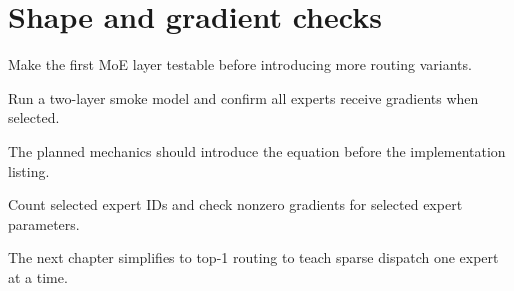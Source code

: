 \section{Shape and gradient checks}
\label{sec:ch03-shape-and-gradient-checks}

Make the first MoE layer testable before introducing more routing variants.



Run a two-layer smoke model and confirm all experts receive gradients when selected.



The planned mechanics should introduce the equation before the implementation listing.





\begin{checkpointbox}
Count selected expert IDs and check nonzero gradients for selected expert parameters.
\end{checkpointbox}

The next chapter simplifies to top-1 routing to teach sparse dispatch one expert at a time.
